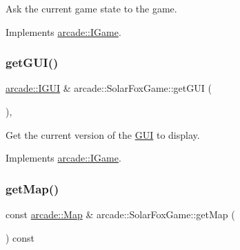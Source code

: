 Ask the current game state to the game. 



Implements \hyperlink{classarcade_1_1_i_game_a75083f0465c0ccbdbbb38c689b4a694c}{arcade\+::\+I\+Game}.

\mbox{\label{classarcade_1_1_solar_fox_game_aba8a5d93b17231c5d2cbbb51cc1d05b9}} 
\subsubsection{\texorpdfstring{get\+G\+U\+I()}{getGUI()}}
{\footnotesize\ttfamily \hyperlink{classarcade_1_1_i_g_u_i}{arcade\+::\+I\+G\+UI} \& arcade\+::\+Solar\+Fox\+Game\+::get\+G\+UI (\begin{DoxyParamCaption}{ }\end{DoxyParamCaption})\hspace{0.3cm}{\ttfamily [override]}, {\ttfamily [virtual]}}



Get the current version of the \hyperlink{classarcade_1_1_g_u_i}{G\+UI} to display. 



Implements \hyperlink{classarcade_1_1_i_game_abe849a6ed370a18de51bc8cb7a2329ba}{arcade\+::\+I\+Game}.

\mbox{\label{classarcade_1_1_solar_fox_game_a89c8912a012a8283f8509e243c4d5b0b}} 
\subsubsection{\texorpdfstring{get\+Map()}{getMap()}}
{\footnotesize\ttfamily const \hyperlink{classarcade_1_1_map}{arcade\+::\+Map} \& arcade\+::\+Solar\+Fox\+Game\+::get\+Map (\begin{DoxyParamCaption}{ }\end{DoxyParamCaption}) const}

\mbox{\label{classarcade_1_1_solar_fox_game_a54b56444f83661b4330de868024671d6}} 
